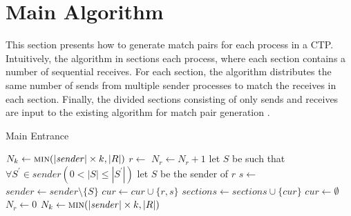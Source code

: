 \section{Main Algorithm}


This section presents how to generate match pairs for each process in a CTP. 
Intuitively, the algorithm in  sections each process, where each section contains a number of sequential receives. For each section, the algorithm distributes the same number of sends from multiple sender processes to match the receives in each section. Finally, the divided sections consisting of only sends and receives are input to the existing algorithm for match pair generation \cite{DBLP:conf/kbse/HuangMM13}. 


\begin{comment}
Sections = {}
cur = {}

while | R | \neq 0 {
  r = dequeue(R);
  S = ()
  if from(r) = * 
     Let S be such that \forall S' \in {S_i, S_j, ...} (count(S) \lte count(S’)) and | S | \neq 0)
	  count(S) += 1
  else
     Let S be such that S = Sender(r)

  cur = cur \cup {r, dequeue(S)}
  if \forall S \in {S_i, S_j, ...} (count(S) = k \vee |S| = 0 \vee | R | = 0)
     Sections  = Sections \cup {cur}
	  cur = {}
	  \forall S \in {S_i, S_j, ...} count(S) = 0;
}
\end{comment}


\begin{algorithm}
\caption{Main Entrance}\label{algo:main}
\begin{algorithmic}[1]
\State $N_k\gets\Call{min}{|\mathit{sender}|\times k, |R|}$
\State $r \gets$ 
\State $N_r\gets N_r+1$
\State let $S$ be such that $\forall S^\prime \in \mathit{sender}(0<|S|\le |S^\prime| )$
\Else 
\State let $S$ be the sender of $r$
\EndIf
\State $s\gets$ 
\State $\mathit{sender}\gets\mathit{sender} \setminus \{S\}$
\EndIf
\State $\mathit{cur}\gets \mathit{cur}\cup \{r,s\}$
\State $\mathit{sections}\gets\mathit{sections}\cup\{\mathit{cur}\}$
\State $\mathit{cur}\gets\emptyset$
\State $N_r\gets 0$
\State $N_k\gets\Call{min}{|\mathit{sender}|\times k, |R|}$
\EndIf
\EndWhile
\end{algorithmic}
\end{algorithm}



